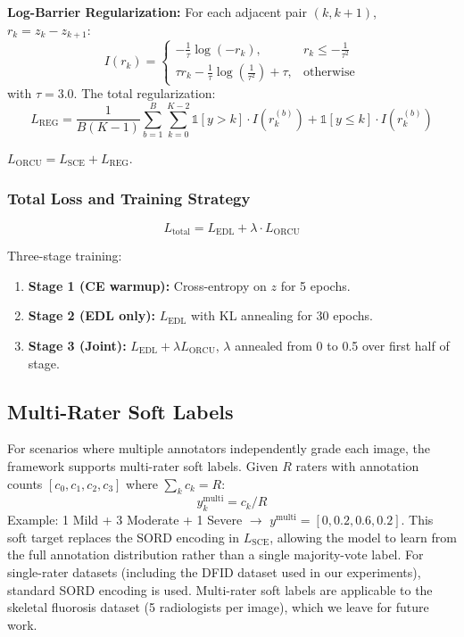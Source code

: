 \textbf{Log-Barrier Regularization:} For each adjacent pair $(k, k+1)$, $r_k = z_k - z_{k+1}$:
\begin{equation}
    I(r_k) = \begin{cases}
        -\frac{1}{\tau} \log(-r_k), & r_k \leq -\frac{1}{\tau^2} \\[4pt]
        \tau r_k - \frac{1}{\tau} \log\left(\frac{1}{\tau^2}\right) + \tau, & \text{otherwise}
    \end{cases}
\end{equation}
with $\tau = 3.0$. The total regularization:
\begin{equation}
    L_{\text{REG}} = \frac{1}{B(K-1)} \sum_{b=1}^{B} \sum_{k=0}^{K-2} \mathbb{1}[y > k] \cdot I(r_k^{(b)}) + \mathbb{1}[y \leq k] \cdot I(r_k^{(b)})
\end{equation}

$L_{\text{ORCU}} = L_{\text{SCE}} + L_{\text{REG}}$.

\subsubsection{Total Loss and Training Strategy}

\begin{equation}
    L_{\text{total}} = L_{\text{EDL}} + \lambda \cdot L_{\text{ORCU}}
\end{equation}

Three-stage training:
\begin{enumerate}
    \item \textbf{Stage 1 (CE warmup):} Cross-entropy on $z$ for 5 epochs.
    \item \textbf{Stage 2 (EDL only):} $L_{\text{EDL}}$ with KL annealing for 30 epochs.
    \item \textbf{Stage 3 (Joint):} $L_{\text{EDL}} + \lambda L_{\text{ORCU}}$, $\lambda$ annealed from 0 to 0.5 over first half of stage.
\end{enumerate}

\subsection{Multi-Rater Soft Labels}

For scenarios where multiple annotators independently grade each image, the framework supports multi-rater soft labels. Given $R$ raters with annotation counts $[c_0, c_1, c_2, c_3]$ where $\sum_k c_k = R$:
\begin{equation}
    y^{\text{multi}}_k = c_k / R
\end{equation}
Example: 1 Mild + 3 Moderate + 1 Severe $\to$ $y^{\text{multi}} = [0, 0.2, 0.6, 0.2]$. This soft target replaces the SORD encoding in $L_{\text{SCE}}$, allowing the model to learn from the full annotation distribution rather than a single majority-vote label. For single-rater datasets (including the DFID dataset used in our experiments), standard SORD encoding is used. Multi-rater soft labels are applicable to the skeletal fluorosis dataset \cite{xu2025mwinc} (5 radiologists per image), which we leave for future work.

